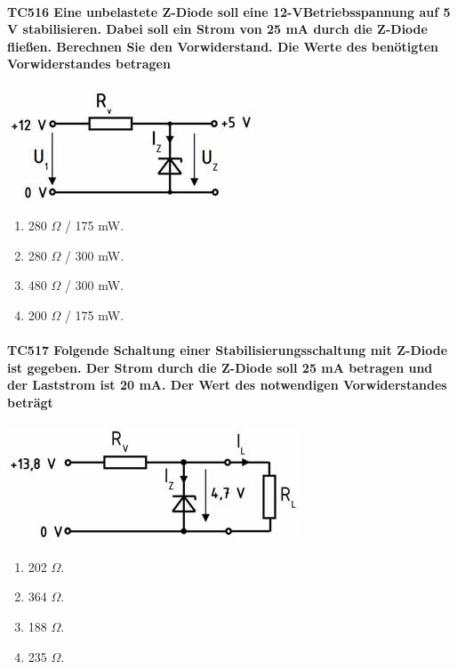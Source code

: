 \documentclass[8pt]{article}
\begin{document}
\begin{enumerate}
\begin{enumerate}[nolistsep,label=\Alph*]
{\begin{enumerate}[nolistsep,label=\Alph*]
\paragraph*{TC516 Eine unbelastete Z-Diode soll eine 12-VBetriebsspannung auf 5 V stabilisieren. Dabei soll ein Strom von 25 mA durch die Z-Diode fließen. Berechnen Sie den Vorwiderstand. Die Werte des benötigten Vorwiderstandes betragen}
\begin{center}
	\begin{minipage}{\linewidth}
		\centering
		\includegraphics[scale=1.0]{pics/tc516_a.jpg}
	\end{minipage}
\end{center}
\begin{enumerate}[nolistsep,label=\Alph*]
\item 280 $\Omega$ / 175 mW.
\item 280 $\Omega$ / 300 mW.
\item 480 $\Omega$ / 300 mW.
\item 200 $\Omega$ / 175 mW.
\end{enumerate}

\paragraph*{TC517 Folgende Schaltung einer Stabilisierungsschaltung mit Z-Diode ist gegeben. Der Strom durch die Z-Diode soll 25 mA betragen und der Laststrom ist 20 mA. Der Wert des notwendigen Vorwiderstandes beträgt}
\begin{center}
	\begin{minipage}{\linewidth}
		\centering
		\includegraphics[scale=1.0]{pics/tc517_a.jpg}
	\end{minipage}
\end{center}
\begin{enumerate}[nolistsep,label=\Alph*]
\item 202 $\Omega$.
\item 364 $\Omega$.
\item 188 $\Omega$.
\item 235 $\Omega$.
\end{enumerate}


\end{enumerate}}
\end{enumerate}
\end{enumerate}
\end{document}
